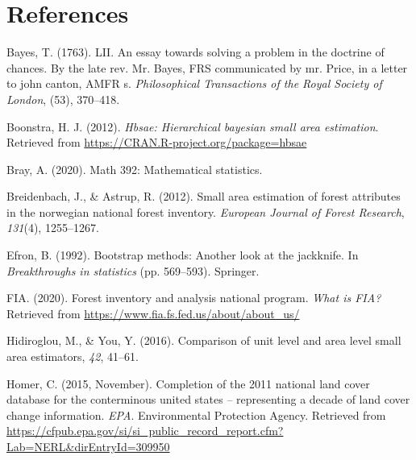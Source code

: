 \documentclass[12pt,twoside]{reedthesis}
\newlength{\cslhangindent}
\newenvironment{CSLReferences}[2] %
 {%
  \setlength{\parindent}{0pt}
  \ifodd #1 \everypar{\setlength{\hangindent}{\cslhangindent}}\ignorespaces\fi
  \ifnum #2 > 0
  \setlength{\parskip}{#2\baselineskip}
  \fi
 }%
 {}
\begin{document}
\hypertarget{references}{%
\chapter*{References}\label{references}}


\noindent

\setlength{\parindent}{-0.20in}
\setlength{\leftskip}{0.20in}
\setlength{\parskip}{8pt}

\hypertarget{refs}{}
\begin{CSLReferences}{1}{0}
\leavevmode{}%
Bayes, T. (1763). LII. An essay towards solving a problem in the doctrine of chances. By the late rev. Mr. Bayes, FRS communicated by mr. Price, in a letter to john canton, AMFR s. \emph{Philosophical Transactions of the Royal Society of London}, (53), 370--418.

\leavevmode{}%
Boonstra, H. J. (2012). \emph{Hbsae: Hierarchical bayesian small area estimation}. Retrieved from \url{https://CRAN.R-project.org/package=hbsae}

\leavevmode{}%
Bray, A. (2020). Math 392: Mathematical statistics.

\leavevmode{}%
Breidenbach, J., \& Astrup, R. (2012). Small area estimation of forest attributes in the norwegian national forest inventory. \emph{European Journal of Forest Research}, \emph{131}(4), 1255--1267.

\leavevmode{}%
Efron, B. (1992). Bootstrap methods: Another look at the jackknife. In \emph{Breakthroughs in statistics} (pp. 569--593). Springer.

\leavevmode{}%
FIA. (2020). Forest inventory and analysis national program. \emph{What is FIA?} Retrieved from \url{https://www.fia.fs.fed.us/about/about_us/}

\leavevmode{}%
Hidiroglou, M., \& You, Y. (2016). Comparison of unit level and area level small area estimators, \emph{42}, 41--61.

\leavevmode{}%
Homer, C. (2015, November). Completion of the 2011 national land cover database for the conterminous united states -- representing a decade of land cover change information. \emph{EPA}. Environmental Protection Agency. Retrieved from \url{https://cfpub.epa.gov/si/si_public_record_report.cfm?Lab=NERL\&dirEntryId=309950}


\end{CSLReferences}
\end{document}
